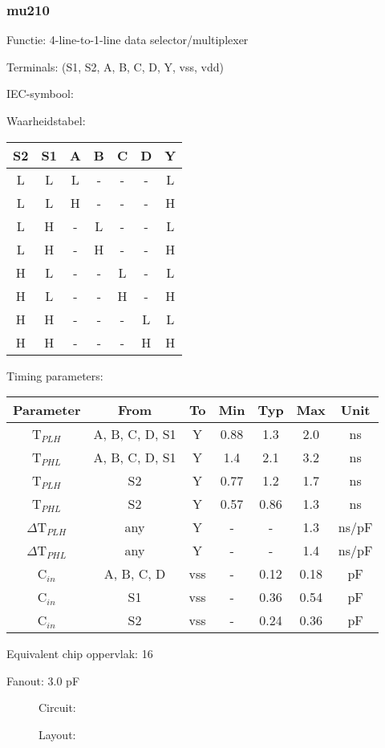 \subsubsection{mu210}

Functie: 4-line-to-1-line data selector/multiplexer

Terminals: (S1, S2, A, B, C, D, Y, vss, vdd)


IEC-symbool:
\begin{figure}[bth]
\end{figure}

Waarheidstabel:
\begin{table}[bth]
\begin{tabular}{|cc|cccc||c|}
\hline
S2	&S1	&A 	&B	&C	&D	&Y\\
\hline
L	&L	&L	&-	&-	&-	&L\\
L	&L	&H	&-	&-	&-	&H\\
L	&H	&- 	&L	&-	&-	&L\\
L	&H	&-	&H	&-	&-	&H\\
H	&L	&-	&-	&L	&-	&L\\
H	&L	&-	&-	&H	&-	&H\\
H	&H	&-	&-	&-	&L	&L\\
H	&H	&-	&-	&-	&H	&H\\
\hline
\end{tabular}
\vspace{.5cm}

	
Timing parameters:\\

\begin{tabular}{|c|cc|ccc|c|}
\hline
Parameter		&From		&To 	&Min	&Typ	&Max	&Unit\\
\hline
T$_{PLH}$		&A, B, C, D, S1	&Y	&0.88	&1.3	&2.0	&ns\\
T$_{PHL}$		&A, B, C, D, S1	&Y	&1.4	&2.1	&3.2	&ns\\
T$_{PLH}$		&S2		&Y	&0.77	&1.2	&1.7	&ns\\
T$_{PHL}$		&S2		&Y	&0.57	&0.86	&1.3	&ns\\
\hline
$\Delta$T$_{PLH}$	&any		&Y	&-	&-	&1.3	&ns/pF\\
$\Delta$T$_{PHL}$	&any		&Y	&-	&-	&1.4	&ns/pF\\
\hline	
C$_{in}$		&A, B, C, D	&vss	&-	&0.12	&0.18	&pF\\
C$_{in}$		&S1		&vss	&-	&0.36	&0.54	&pF\\
C$_{in}$		&S2		&vss	&-	&0.24	&0.36	&pF\\
\hline
\end{tabular}
\end{table}

Equivalent chip oppervlak: 16

Fanout: 3.0 pF



\begin{figure}[bth]
Circuit:\\

\end{figure}



\begin{figure}[bth]
Layout:\\

\end{figure}


\clearpage






